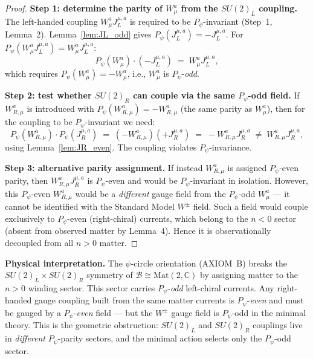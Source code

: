 \documentclass[12pt,a4paper]{article}
\theoremstyle{definition}
\theoremstyle{remark}
\begin{document}
\begin{proof}
\textbf{Step 1: determine the parity of $W_\mu^a$ from the $SU(2)_L$ coupling.}
The left-handed coupling $W_\mu^a J^{\mu,a}_L$ is required to be $P_\psi$-invariant
(Step~1, Lemma~2).  Lemma~\ref{lem:JL_odd} gives $P_\psi(J^{\mu,a}_L) = -J^{\mu,a}_L$.
For $P_\psi(W_\mu^a J^{\mu,a}_L) = W_\mu^a J^{\mu,a}_L$:
\begin{equation}
  P_\psi(W_\mu^a)\cdot(-J^{\mu,a}_L) \;=\; W_\mu^a J^{\mu,a}_L,
\end{equation}
which requires $P_\psi(W_\mu^a) = -W_\mu^a$, i.e., $W_\mu^a$ is $P_\psi$-\emph{odd}.

\textbf{Step 2: test whether $SU(2)_R$ can couple via the same $P_\psi$-odd field.}
If $W_{R,\mu}^a$ is introduced with $P_\psi(W_{R,\mu}^a) = -W_{R,\mu}^a$
(the same parity as $W_\mu^a$), then for the coupling to be $P_\psi$-invariant
we need:
\begin{equation}
  P_\psi(W_{R,\mu}^a)\cdot P_\psi(J^{\mu,a}_R)
  \;=\;
  (-W_{R,\mu}^a)(+J^{\mu,a}_R)
  \;=\;
  -W_{R,\mu}^a J^{\mu,a}_R
  \;\neq\;
  W_{R,\mu}^a J^{\mu,a}_R,
\end{equation}
using Lemma~\ref{lem:JR_even}.
The coupling violates $P_\psi$-invariance.

\textbf{Step 3: alternative parity assignment.}
If instead $W_{R,\mu}^a$ is assigned $P_\psi$-even parity,
then $W_{R,\mu}^a J^{\mu,a}_R$ is $P_\psi$-even and would be
$P_\psi$-invariant in isolation.
However, this $P_\psi$-even $W_{R,\mu}^a$ would be a \emph{different} gauge field
from the $P_\psi$-odd $W_\mu^a$ — it cannot be identified with the Standard Model
$W^\pm$ field.  Such a field would couple exclusively to $P_\psi$-even (right-chiral)
currents, which belong to the $n<0$ sector (absent from observed matter by Lemma~4).
Hence it is observationally decoupled from all $n>0$ matter.
\end{proof}

\begin{insightbox}
  \textbf{Physical interpretation.}
  The $\psi$-circle orientation (AXIOM~B) breaks the
  $SU(2)_L\times SU(2)_R$ symmetry of $\mathcal{B}\cong\mathrm{Mat}(2,\mathbb{C})$
  by assigning matter to the $n>0$ winding sector.
  This sector carries $P_\psi$-\emph{odd} left-chiral currents.
  Any right-handed gauge coupling built from the same matter currents
  is $P_\psi$-\emph{even} and must be gauged by a $P_\psi$-\emph{even} field —
  but the $W^\pm$ gauge field is $P_\psi$-odd in the minimal theory.
  This is the geometric obstruction: $SU(2)_L$ and $SU(2)_R$ couplings
  live in \emph{different} $P_\psi$-parity sectors, and the minimal action
  selects only the $P_\psi$-odd sector.
\end{insightbox}
\end{document}
